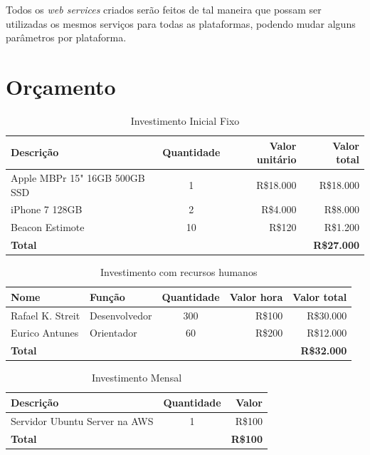 \documentclass[
	12pt,
	oneside,
	a4paper,
	english,
	brazil,
]{abntex2}
\begin{document}
Todos os \emph{web services} criados serão feitos de tal maneira que possam ser utilizadas os mesmos serviços para todas as plataformas, podendo mudar alguns parâmetros por plataforma.



\chapter{Orçamento}

\noindent
\begin{table}[ht]
    \caption{Investimento Inicial Fixo}
    
    \begin{tabularx}{\textwidth}{X|c|r|r}
    \hline
        \textbf{Descrição} &
        \textbf{Quantidade} & 
        \textbf{Valor unitário} & 
        \textbf{Valor total} \\
    \hline
        Apple MBPr 15" 16GB 500GB SSD&1&R\$18.000&R\$18.000 \\
        iPhone 7 128GB&2&R\$4.000&R\$8.000 \\
        Beacon Estimote&10&R\$120&R\$1.200 \\ [1ex]
    \hline
        \textbf{Total}&&&\textbf{R\$27.000} \\ [1ex]
    \end{tabularx}
\end{table}

\noindent
\begin{table}[ht]
    \caption{Investimento com recursos humanos}

    \begin{tabularx}{\textwidth}{X|l|c|r|r}
    \hline
        \textbf{Nome} & 
        \textbf{Função} & 
        \textbf{Quantidade} & 
        \textbf{Valor hora} &
        \textbf{Valor total} \\
    \hline
        Rafael K. Streit&Desenvolvedor &300&R\$100&R\$30.000\\
        Eurico Antunes&Orientador&60&R\$200&R\$12.000 \\
    \hline
        \textbf{Total} &&&& \textbf{R\$32.000} \\
    \end{tabularx}
\end{table}

\noindent
\begin{table}[ht]
    \caption{Investimento Mensal}
    \begin{tabularx}{\textwidth}{X|c|r}
    \hline
        \textbf{Descrição} &
        \textbf{Quantidade} &
        \textbf{Valor} \\
    \hline
        Servidor Ubuntu Server na AWS &1 &R\$100 \\
    \hline
        \textbf{Total}&&\textbf{R\$100} \\ [1ex]
    \end{tabularx}
\end{table}
\end{document}
